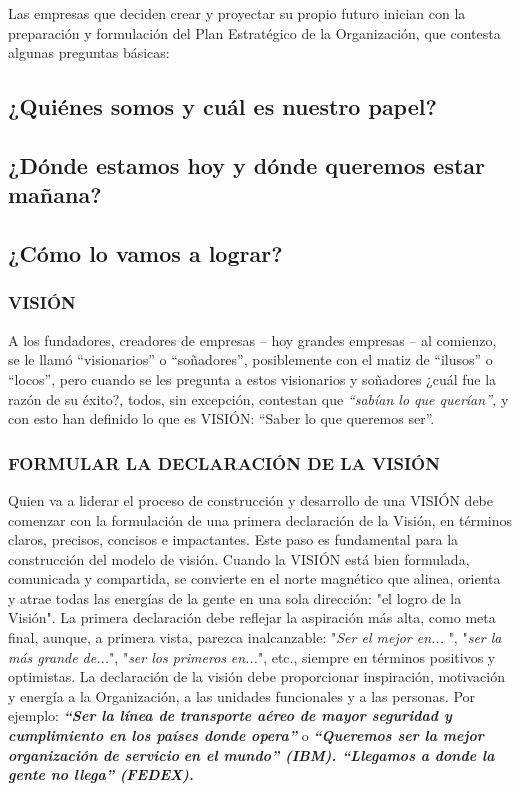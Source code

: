 Las empresas que deciden crear y proyectar su propio futuro inician con la preparación y formulación del Plan Estratégico de la Organización, que contesta algunas preguntas básicas:

\subsection*{¿Quiénes somos y cuál es nuestro papel?}
\subsection*{¿Dónde estamos hoy y dónde queremos estar mañana?}
\subsection*{¿Cómo lo vamos a lograr?}
\subsubsection*{VISIÓN}
A los fundadores, creadores de empresas – hoy grandes empresas – al comienzo, se le llamó “visionarios” o “soñadores”, posiblemente con el matiz de “ilusos” o “locos”, pero cuando se les pregunta a estos visionarios y soñadores ¿cuál fue la razón de su éxito?, todos, sin excepción, contestan que \textit{“sabían lo que querían”, }y con esto han definido lo que es VISIÓN: “Saber lo que queremos ser”.

\subsubsection*{FORMULAR LA DECLARACIÓN DE LA VISIÓN}
Quien va a liderar el proceso de construcción y desarrollo de una VISIÓN debe comenzar con la formulación de una primera declaración de la Visión, en términos claros, precisos, concisos e impactantes. Este paso es fundamental para la construcción del modelo de visión. Cuando la VISIÓN está bien formulada, comunicada y compartida, se convierte en el norte magnético que alinea, orienta y atrae todas las energías de la gente en una sola dirección: "el logro de la Visión". La primera declaración debe reflejar la aspiración más alta, como meta final, aunque, a primera vista, parezca inalcanzable: "\textit{Ser el mejor en... }", "\textit{ser la más grande de...}", "\textit{ser los primeros} \textit{en...}", etc., siempre en términos positivos y optimistas. La declaración de la visión debe proporcionar inspiración, motivación y energía a la Organización, a las unidades funcionales y a las personas. Por ejemplo: \textbf{\textit{“Ser la línea de transporte aéreo de mayor seguridad y}} \textbf{\textit{cumplimiento en los países donde opera” }}o \textbf{\textit{“Queremos ser la mejor organización de servicio}} \textbf{\textit{en el mundo” (IBM). “Llegamos a donde la gente no llega” (FEDEX).}}

